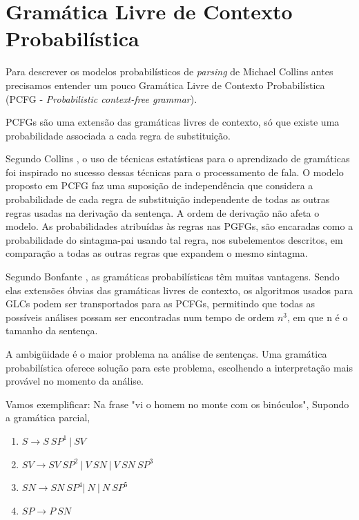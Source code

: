 \section{Gramática Livre de Contexto Probabilística}
\label{sec:pcfg}

Para descrever os modelos  probabilísticos  de \emph{parsing} de Michael Collins antes precisamos entender um pouco Gramática Livre de Contexto Probabilística (PCFG - \emph{Probabilistic context-free grammar}).

PCFGs são uma extensão das gramáticas livres de contexto, só que existe uma probabilidade associada a cada regra de substituição.

Segundo Collins \cite{collins99}, o uso de técnicas estatísticas para o aprendizado de gramáticas foi inspirado no sucesso dessas técnicas para o processamento de fala. O modelo proposto em PCFG faz uma suposição de independência que considera a probabilidade de cada regra de substituição independente de todas as outras regras usadas na derivação da sentença. A ordem de derivação não afeta o modelo. As probabilidades atribuídas às regras nas PGFGs, são encaradas como a probabilidade do sintagma-pai usando tal regra, nos subelementos descritos, em comparação a todas as outras regras que expandem o mesmo sintagma.

Segundo Bonfante \cite{bonfante03}, as gramáticas probabilísticas têm muitas vantagens. Sendo elas extensões óbvias das gramáticas livres de contexto, os algoritmos usados para GLCs podem ser transportados para as PCFGs, permitindo que todas as possíveis análises possam ser encontradas num tempo de ordem $n^3$, em que n é o tamanho da sentença.

A ambigüidade é o maior problema na análise de sentenças. Uma gramática probabilística oferece solução para este problema, escolhendo a interpretação mais provável no momento da análise.

Vamos exemplificar: Na frase "vi o homem no monte com os binóculos", Supondo a gramática parcial,

\begin{enumerate}
  \item $ S \rightarrow S \  SP^1 \ |\ SV $
  \item $ SV \rightarrow SV \ SP^2  \ |\  V \ SN \ |\ V \ SN \ SP^3 $
  \item $ SN \rightarrow SN \ SP^4  | \  N \  |  \ N \ SP^5 $
  \item $ SP \rightarrow P \ SN  $
\end{enumerate}

